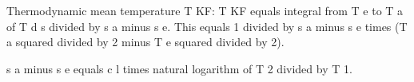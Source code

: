 Thermodynamic mean temperature T KF:  
T KF equals integral from T e to T a of T d s divided by s a minus s e.  
This equals 1 divided by s a minus s e times (T a squared divided by 2 minus T e squared divided by 2).  

s a minus s e equals c l times natural logarithm of T 2 divided by T 1.